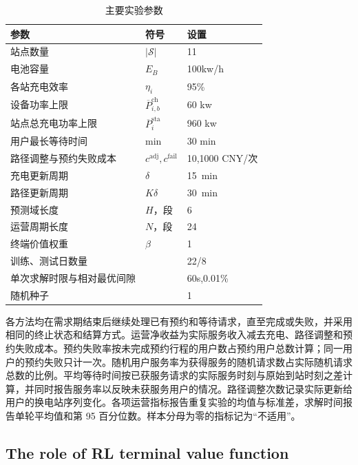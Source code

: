 \begin{table}[!htbp]
  \centering
  \caption{主要实验参数}
  \label{exp:parameters}
  \small
  \setlength{\tabcolsep}{5pt}
  \begin{tabularx}{\linewidth}{@{}Xll@{}}
    \toprule
    参数 & 符号 & 设置 \\
    \midrule
    站点数量 & $|\mathcal S|$ & 11 \\
    电池容量 & $E_B$  & 100kw/h \\
    各站充电效率 & $\eta_i$ & 95\% \\
    设备功率上限 & $\overline P_{i,b}^{\mathrm{ch}}$ & 60 kw\\
    站点总充电功率上限 & $\overline P_i^{\mathrm{sta}}$ & 960 kw\\
    用户最长等待时间 & min & 30 min \\
    路径调整与预约失败成本 & $c^{\mathrm{adj}},c^{\mathrm{fail}}$ & 10,1000 CNY/次\\
    充电更新周期 & $\delta$ & 15~min \\
    路径更新周期 & $K\delta$ & 30~min \\
    预测域长度 & $H$，段 & 6 \\
    运营周期长度 & $N$，段 & 24 \\
    终端价值权重 & $\beta$ & 1 \\
    训练、测试日数量 & \ & 22/8 \\
    单次求解时限与相对最优间隙 & \ & 60s,0.01\% \\
    随机种子 & \ & 1 \\
    \bottomrule
  \end{tabularx}
\end{table}

各方法均在需求期结束后继续处理已有预约和等待请求，直至完成或失败，并采用相同的终止状态和结算方式。运营净收益为实际服务收入减去充电、路径调整和预约失败成本。预约失败率按未完成预约行程的用户数占预约用户总数计算；同一用户的预约失败只计一次。随机用户服务率为获得服务的随机请求数占实际随机请求总数的比例。平均等待时间按已获服务请求的实际服务时刻与原始到站时刻之差计算，并同时报告服务率以反映未获服务用户的情况。路径调整次数记录实际更新给用户的换电站序列变化。各项运营指标报告重复实验的均值与标准差，求解时间报告单轮平均值和第 95 百分位数。样本分母为零的指标记为“不适用”。



\FloatBarrier
\subsection{The role of RL terminal value function}
\label{exp:terminal}

